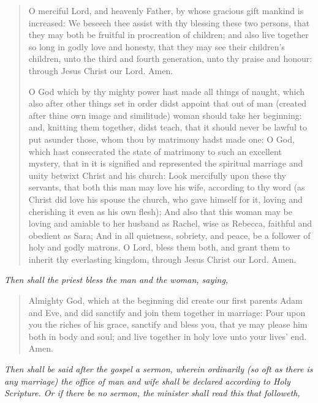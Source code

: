 \documentclass[
]{book}
\begin{document}
\begin{quote}
O merciful Lord, and heavenly Father, by whose gracious gift mankind is increased: We beseech thee assist with thy blessing these two persons, that they may both be fruitful in procreation of children; and also live together so long in godly love and honesty, that they may see their children's children, unto the third and fourth generation, unto thy praise and honour: through Jesus Christ our Lord. Amen.

O God which by thy mighty power hast made all things of naught, which also after other things set in order didst appoint that out of man (created after thine own image and similitude) woman should take her beginning: and, knitting them together, didst teach, that it should never be lawful to put asunder those, whom thou by matrimony hadst made one: O God, which hast consecrated the state of matrimony to such an excellent mystery, that in it is signified and represented the spiritual marriage and unity betwixt Christ and his church: Look mercifully upon these thy servants, that both this man may love his wife, according to thy word (as Christ did love his spouse the church, who gave himself for it, loving and cherishing it even as his own flesh); And also that this woman may be loving and amiable to her husband as Rachel, wise as Rebecca, faithful and obedient as Sara; And in all quietness, sobriety, and peace, be a follower of holy and godly matrons. O Lord, bless them both, and grant them to inherit thy everlasting kingdom, through Jesus Christ our Lord. Amen.
\end{quote}

\begin{center}
\emph{Then shall the priest bless the man and the woman, saying,}

\end{center}

\begin{quote}
Almighty God, which at the beginning did create our first parents Adam and Eve, and did sanctify and join them together in marriage: Pour upon you the riches of his grace, sanctify and bless you, that ye may please him both in body and soul; and live together in holy love unto your lives' end. Amen.
\end{quote}

\begin{center}
\emph{Then shall be said after the gospel a sermon, wherein ordinarily (so oft as there is any marriage) the office of man and wife shall be declared according to Holy Scripture. Or if there be no sermon, the minister shall read this that followeth,}

\end{center}
\end{document}
